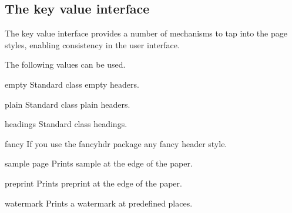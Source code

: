 \subsection{The key value interface}

The key value interface provides a number of mechanisms to tap into the page styles, enabling consistency in the user interface.

\medskip

 The following values can be used.

\begin{marglist}
\item [empty] Standard class empty headers.
\item [plain] Standard class plain headers.
\item [headings] Standard class headings.
\item [fancy] If you use the fancyhdr package any fancy header style.
\item [sample page] Prints sample at the edge of the paper.
\item [preprint] Prints preprint at the edge of the paper.
\item [watermark] Prints a watermark at predefined places.
\end{marglist}





%
%
%
%






